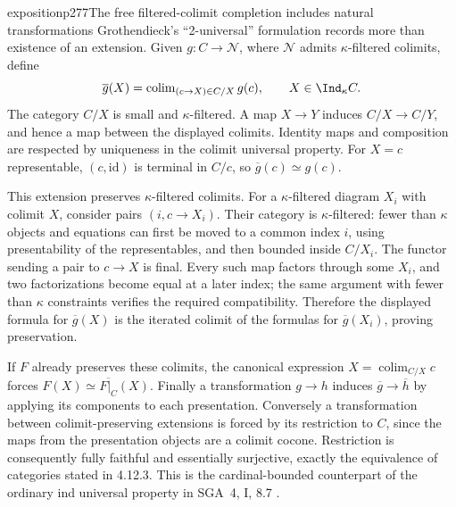 \begin{dcomment}{exposition}{p277}{The free filtered-colimit completion includes natural transformations}
Grothendieck's ``2-universal'' formulation records more than existence of an extension. Given $g:C\to\mathcal N$, where $\mathcal N$ admits $\kappa$-filtered colimits, define
\[
 \overline g(X)=\operatorname{colim}_{(c\to X)\in C/X}g(c),
 \qquad X\in\Ind_\kappa C.
\]
The category $C/X$ is small and $\kappa$-filtered. A map $X\to Y$ induces $C/X\to C/Y$, and hence a map between the displayed colimits. Identity maps and composition are respected by uniqueness in the colimit universal property. For $X=c$ representable, $(c,\mathrm{id})$ is terminal in $C/c$, so $\overline g(c)\simeq g(c)$.

This extension preserves $\kappa$-filtered colimits. For a $\kappa$-filtered diagram $X_i$ with colimit $X$, consider pairs $(i,c\to X_i)$. Their category is $\kappa$-filtered: fewer than $\kappa$ objects and equations can first be moved to a common index $i$, using presentability of the representables, and then bounded inside $C/X_i$. The functor sending a pair to $c\to X$ is final. Every such map factors through some $X_i$, and two factorizations become equal at a later index; the same argument with fewer than $\kappa$ constraints verifies the required compatibility. Therefore the displayed formula for $\overline g(X)$ is the iterated colimit of the formulas for $\overline g(X_i)$, proving preservation.

If $F$ already preserves these colimits, the canonical expression $X=\operatorname{colim}_{C/X}c$ forces $F(X)\simeq\overline{F|_C}(X)$. Finally a transformation $g\to h$ induces $\overline g\to\overline h$ by applying its components to each presentation. Conversely a transformation between colimit-preserving extensions is forced by its restriction to $C$, since the maps from the presentation objects are a colimit cocone. Restriction is consequently fully faithful and essentially surjective, exactly the equivalence of categories stated in 4.12.3. This is the cardinal-bounded counterpart of the ordinary ind universal property in SGA~4, I, 8.7 \citep{SGA4I1972}.
\end{dcomment}

